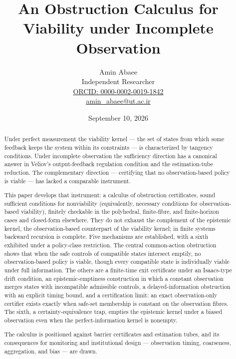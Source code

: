 \documentclass[11pt]{article}
\theoremstyle{definition}
\begin{document}
\title{An Obstruction Calculus for Viability under Incomplete Observation}
\author{Amin Abaee\\[0.35em]
{\small Independent Researcher}\\[0.55em]
{\small\href{https://orcid.org/0000-0002-0019-1842}{ORCID: 0000-0002-0019-1842}}\\[0.3em]
{\small\href{mailto:amin\_abaee@ut.ac.ir}{amin\_abaee@ut.ac.ir}}}
\date{September 10, 2026}
\maketitle

\begin{abstract}

Under perfect measurement the viability kernel --- the set of states
from which some feedback keeps the system within its constraints --- is
characterized by tangency conditions. Under incomplete observation the
sufficiency direction has a canonical answer in Veliov's
output-feedback regulation condition and the estimation-tube reduction.
The complementary direction --- certifying that no observation-based
policy is viable --- has lacked a comparable instrument.

This paper develops that instrument: a calculus of obstruction
certificates, sound sufficient conditions for nonviability (equivalently,
necessary conditions for observation-based viability), finitely
checkable in the polyhedral, finite-fibre, and finite-horizon cases and closed-form elsewhere. They do not exhaust the complement of the epistemic kernel, the observation-based counterpart of the viability kernel; in finite systems backward recursion is complete. Five mechanisms are established, with a sixth exhibited under a
policy-class restriction. The central common-action obstruction shows
that when the safe controls of compatible states intersect emptily, no
observation-based policy is viable, though every compatible state is
individually viable under full information. The others are a finite-time
exit certificate under an Isaacs-type drift condition, an
epistemic-emptiness construction in which a constant observation merges
states with incompatible admissible controls, a delayed-information
obstruction with an explicit timing bound, and a certification limit:
an exact observation-only certifier exists exactly when safe-set
membership is constant on the observation fibres. The sixth, a
certainty-equivalence trap, empties the epistemic kernel under a biased
observation even when the perfect-information kernel is nonempty.

The calculus is positioned against barrier certificates and estimation
tubes, and its consequences for monitoring and institutional design ---
observation timing, coarseness, aggregation, and bias --- are drawn.

\end{abstract}
\end{document}
